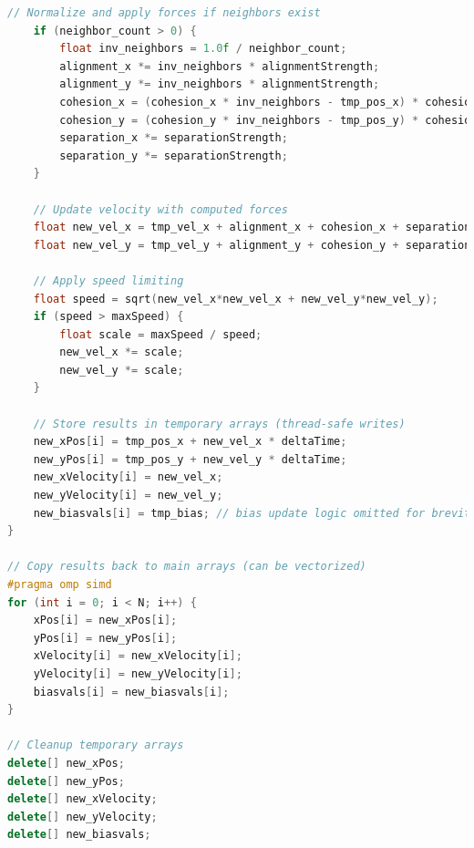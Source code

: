 \documentclass[10pt,twocolumn,letterpaper]{article}
\begin{document}
\begin{lstlisting}[language=C++, caption=Parallel Boids implementation using OpenMP]
    // Normalize and apply forces if neighbors exist
    if (neighbor_count > 0) {
        float inv_neighbors = 1.0f / neighbor_count;
        alignment_x *= inv_neighbors * alignmentStrength;
        alignment_y *= inv_neighbors * alignmentStrength;
        cohesion_x = (cohesion_x * inv_neighbors - tmp_pos_x) * cohesionStrength;
        cohesion_y = (cohesion_y * inv_neighbors - tmp_pos_y) * cohesionStrength;
        separation_x *= separationStrength;
        separation_y *= separationStrength;
    }
    
    // Update velocity with computed forces
    float new_vel_x = tmp_vel_x + alignment_x + cohesion_x + separation_x;
    float new_vel_y = tmp_vel_y + alignment_y + cohesion_y + separation_y;
    
    // Apply speed limiting
    float speed = sqrt(new_vel_x*new_vel_x + new_vel_y*new_vel_y);
    if (speed > maxSpeed) {
        float scale = maxSpeed / speed;
        new_vel_x *= scale;
        new_vel_y *= scale;
    }
    
    // Store results in temporary arrays (thread-safe writes)
    new_xPos[i] = tmp_pos_x + new_vel_x * deltaTime;
    new_yPos[i] = tmp_pos_y + new_vel_y * deltaTime;
    new_xVelocity[i] = new_vel_x;
    new_yVelocity[i] = new_vel_y;
    new_biasvals[i] = tmp_bias; // bias update logic omitted for brevity
}

// Copy results back to main arrays (can be vectorized)
#pragma omp simd
for (int i = 0; i < N; i++) {
    xPos[i] = new_xPos[i];
    yPos[i] = new_yPos[i];
    xVelocity[i] = new_xVelocity[i];
    yVelocity[i] = new_yVelocity[i];
    biasvals[i] = new_biasvals[i];
}

// Cleanup temporary arrays
delete[] new_xPos;
delete[] new_yPos;
delete[] new_xVelocity;
delete[] new_yVelocity;
delete[] new_biasvals;
\end{lstlisting}


\end{document}
